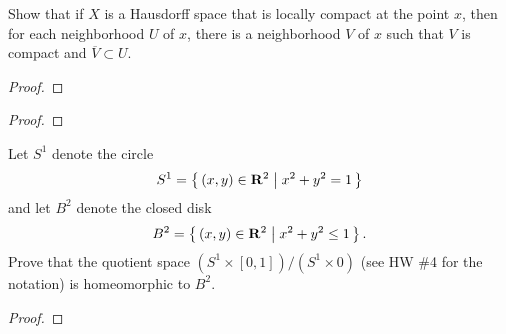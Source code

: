 \begin{problem}[Munkres \S28, Ex.\,10]
Show that if $X$ is a Hausdorff space that is locally compact at
the point $x$, then for each neighborhood $U$ of $x$, there is a
neighborhood $V$ of $x$ such that $V$ is compact and $\overline
V\subset U$.
\end{problem}
\begin{proof}
\end{proof}
\newpage
\begin{problem}
\end{problem}
\begin{proof}
\end{proof}
\newpage
\begin{problem}[A]
Let $S^1$ denote the circle
\[
S^1=\left\{\,(x,y)\in\mathbf{R}^2\;\middle|\;x^2+y^2=1\,\right\}
\]
and let $B^2$ denote the closed disk
\[
B^2=\left\{\,(x,y)\in\mathbf{R}^2\;\middle|\;x^2+y^2\leq 1\,\right\}.
\]
Prove that the quotient space $(S^1\times[0,1])/(S^1\times 0)$
(see HW \#4 for the notation) is homeomorphic to $B^2$.
\end{problem}
\begin{proof}
\end{proof}

